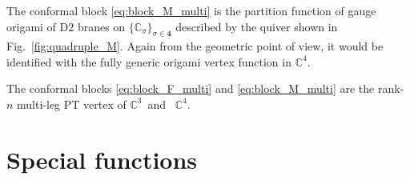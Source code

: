 The conformal block \eqref{eq:block_M_multi} is the partition function of gauge origami of D2 branes on $\{\mathbb{C}_\sigma\}_{\sigma \in \underline{\mathbf{4}}}$ described by the quiver shown in Fig.~\ref{fig:quadruple_M}.
Again from the geometric point of view, it would be identified with the fully generic origami vertex function in $\mathbb{C}^4$.

\begin{conjecture}\label{conj:origami_vertex}
    The conformal blocks \eqref{eq:block_F_multi} and \eqref{eq:block_M_multi} are the rank-$n$ multi-leg PT vertex of $\mathbb{C}^3$~and~ $\mathbb{C}^4$.
\end{conjecture}

\appendix

\section{Special functions}


